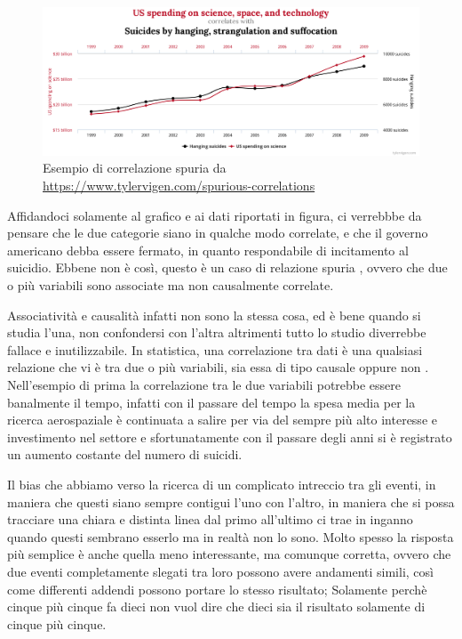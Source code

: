\begin{figure}[h]
    \begin{center}
        \includegraphics[width=\linewidth]{img/chart.png}
        \caption{Esempio di correlazione spuria da 
        \url{https://www.tylervigen.com/spurious-correlations}}
        \label{fig:spurious_relations}
    \end{center}
\end{figure}

Affidandoci solamente al grafico e ai dati riportati in 
figura, ci verrebbbe da pensare che le due categorie 
siano in qualche modo correlate, e che il governo 
americano debba essere fermato, in quanto respondabile di 
incitamento al suicidio.
Ebbene non è così, questo è un caso di relazione 
spuria \cite{wiki:Spurious_relationship}, ovvero che due o 
più variabili sono associate ma non causalmente correlate.

Associatività e causalità infatti non sono la stessa cosa,
ed è bene quando si studia l'una, non confondersi con l'altra
altrimenti tutto lo studio diverrebbe fallace e inutilizzabile.
In statistica, una correlazione tra dati è una qualsiasi 
relazione che vi è tra due o più variabili, sia essa di 
tipo causale oppure non \cite{wiki:Correlation}. 
Nell'esempio di prima la correlazione
tra le due variabili potrebbe essere banalmente il tempo, 
infatti con il passare del tempo la spesa media per la 
ricerca aerospaziale è continuata a salire per via 
del sempre più alto interesse e investimento nel settore
e sfortunatamente con il passare degli anni si è registrato
un aumento costante del numero di suicidi. 

Il bias che abbiamo verso la ricerca di un complicato intreccio
tra gli eventi, in maniera che questi siano sempre contigui
l'uno con l'altro, in maniera che si possa tracciare una 
chiara e distinta linea dal primo all'ultimo ci trae in 
inganno quando questi sembrano esserlo ma in realtà non lo sono.
Molto spesso la risposta più semplice è anche quella meno 
interessante, ma comunque corretta, ovvero che due eventi 
completamente slegati tra loro possono avere andamenti simili, 
così come differenti addendi possono portare lo stesso risultato; 
Solamente perchè cinque più cinque fa dieci non vuol dire che 
dieci sia il risultato solamente di cinque più cinque.

